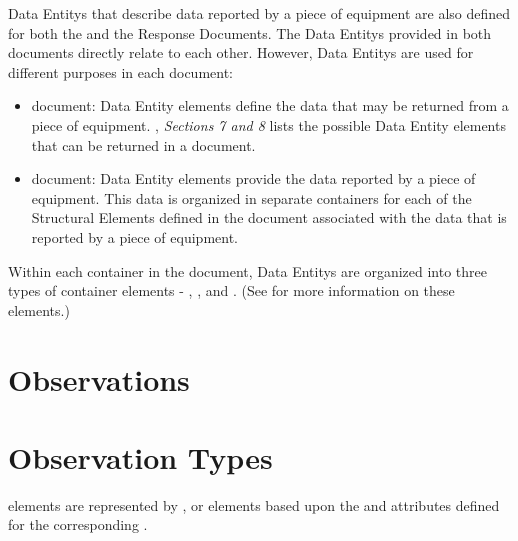 \glspl{Data Entity} that describe data reported by a piece of equipment are also defined for both the  and the  \glspl{Response Document}.  The \glspl{Data Entity} provided in both documents directly relate to each other.  However, \glspl{Data Entity} are used for different purposes in each document:

\begin{itemize}
\item {} document: \gls{Data Entity} elements define the data that may be returned from a piece of equipment.  , \textit{Sections 7 and 8} lists the possible \gls{Data Entity} elements that can be returned in a  document.  

\item {} document: \gls{Data Entity} elements provide the data reported by a piece of equipment.  This data is organized in separate  containers for each of the \glspl{Structural Element} defined in the  document associated with the data that is reported by a piece of equipment.  
\end{itemize}

Within each  container in the  document, \glspl{Data Entity} are organized into three types of container elements - , , and .  (See  for more information on these elements.)


\section{Observations}
\label{sec:Observations}









\section{Observation Types}
\label{sec:Observation Types}

 elements are represented by ,  or  elements based upon the  and  attributes defined for the corresponding .









